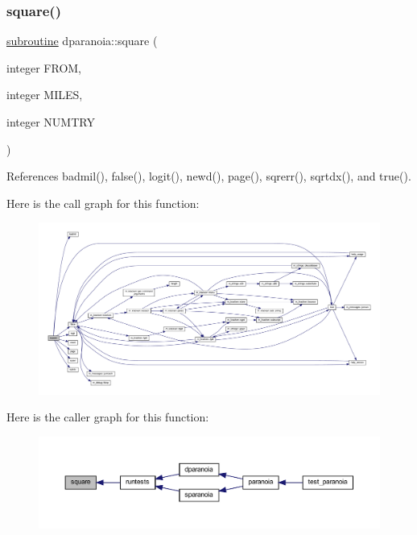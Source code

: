 \subsubsection{\texorpdfstring{square()}{square()}}
{\footnotesize\ttfamily \hyperlink{M__stopwatch_83_8txt_acfbcff50169d691ff02d4a123ed70482}{subroutine} dparanoia\+::square (\begin{DoxyParamCaption}\item[{integer}]{F\+R\+OM,  }\item[{integer}]{M\+I\+L\+ES,  }\item[{integer}]{N\+U\+M\+T\+RY }\end{DoxyParamCaption})}



References badmil(), false(), logit(), newd(), page(), sqrerr(), sqrtdx(), and true().

Here is the call graph for this function\+:
\nopagebreak
\begin{figure}[H]
\begin{center}
\leavevmode
\includegraphics[width=350pt]{dparanoia_8f90_a3df535611e179b371692d3389d67f55e_cgraph}
\end{center}
\end{figure}
Here is the caller graph for this function\+:
\nopagebreak
\begin{figure}[H]
\begin{center}
\leavevmode
\includegraphics[width=350pt]{dparanoia_8f90_a3df535611e179b371692d3389d67f55e_icgraph}
\end{center}
\end{figure}
\mbox{\label{dparanoia_8f90_aa99be2fbd962a1d98b5066c736157b46}} 
